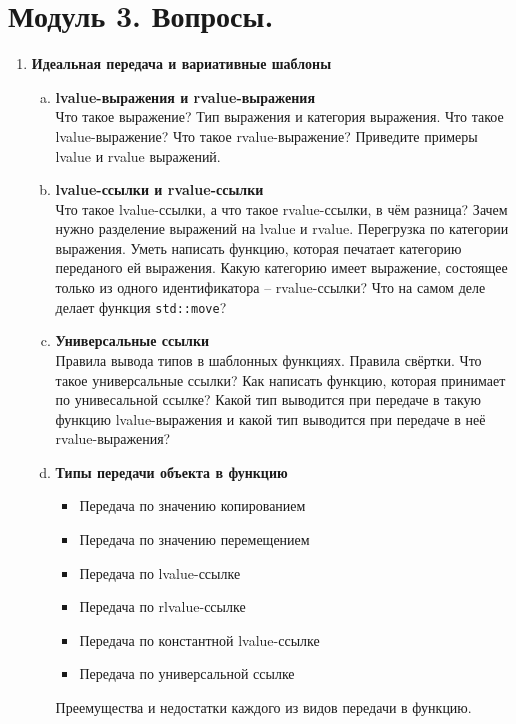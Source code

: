 \documentclass{article}
\begin{document}

\section*{Модуль 3. Вопросы.}
\begin{enumerate}

\item \textbf{Идеальная передача и вариативные шаблоны}
\begin{enumerate}[a.]
\item \textbf{lvalue-выражения и rvalue-выражения}\\
Что такое выражение? Тип выражения и категория выражения. Что такое lvalue-выражение? Что такое rvalue-выражение? Приведите примеры lvalue и rvalue выражений.


\item \textbf{lvalue-ссылки и rvalue-ссылки}\\
Что такое lvalue-ссылки, а что такое rvalue-ссылки, в чём разница? Зачем нужно разделение выражений на lvalue и rvalue. Перегрузка по категории выражения. Уметь написать функцию, которая печатает категорию переданого ей выражения. Какую категорию имеет выражение, состоящее только из одного идентификатора -- rvalue-ссылки? Что на самом деле делает функция \texttt{std::move}?


\item \textbf{Универсальные ссылки}\\
Правила вывода типов в шаблонных функциях. Правила свёртки. Что такое универсальные ссылки? Как написать функцию, которая принимает по унивесальной ссылке? Какой тип выводится при передаче в такую функцию lvalue-выражения и какой тип выводится при передаче в неё rvalue-выражения? 


\item \textbf{Типы передачи объекта в функцию}
\begin{itemize}
\item Передача по значению копированием
\item Передача по значению перемещением
\item Передача по lvalue-ссылке
\item Передача по rlvalue-ссылке
\item Передача по константной lvalue-ссылке
\item Передача по универсальной ссылке
\end{itemize}
Преемущества и недостатки каждого из видов передачи в функцию.



\end{enumerate}
\end{enumerate}
\end{document}
